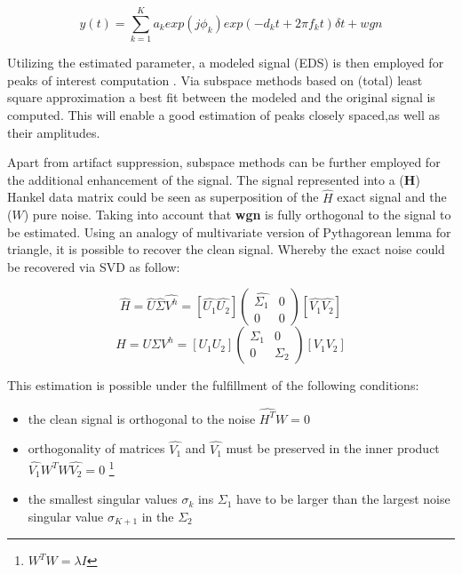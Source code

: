  
\begin{equation}\label{eq1}
y(t)=\sum_{k=1}^{K} a_{k}exp(j\phi_{k})exp(-d_{k}t+2\pi f_{k}t)\delta t+wgn
\end{equation}

Utilizing the estimated parameter, a modeled signal (EDS) is then employed for peaks of interest computation . Via subspace methods based on (total) least square approximation a best fit between the modeled and the original signal is computed. This will enable a good estimation of peaks closely spaced,as well as their amplitudes. 



Apart from artifact suppression, subspace methods can be further employed for the additional enhancement of the signal. The signal represented into a (\textbf{H}) Hankel data matrix could be seen as superposition of the $\hat{H}$ exact signal and the ($W$) pure noise. Taking into account that \textbf{wgn} is fully orthogonal to the signal to be estimated. Using an analogy of multivariate version of Pythagorean lemma for triangle, it is possible to recover the clean signal. Whereby the exact noise could be recovered via SVD as follow:


\begin{figure}[!htbp]
%
\centering
\begin{equation}
 \hat{H}=\hat{U}\hat{\Sigma}\hat{V^{h}}=[\hat{U_{1}} \hat{U_{2}}]
\begin{pmatrix}
 \hat{\Sigma_{1}}&0\\
 0&0
 \end{pmatrix}
 [\hat{V_{1}} \hat{V_{2}}]
 \end{equation}
\endminipage\hfill
{}%
\centering
 \begin{equation}\label{eq3}
 H=U \Sigma V^{h}=[U_{1} U_{2}]
\begin{pmatrix}
 \Sigma_{1}&0\\
 0&\Sigma_{2}
 \end{pmatrix}
 [V_{1} V_{2}] 
\end{equation}
\endminipage\hfill
\end{figure}

This estimation is possible under the fulfillment of the following conditions:
\begin{itemize}
    \item the clean signal is orthogonal to the noise $\hat{H^{T}}W=0$
    \item orthogonality of matrices $\hat{V_{1}}$ and $\hat{V_{1}}$ must be preserved in the inner product $\hat{V_{1}}W^{T}W\hat{V_{2}}=0$ \footnote{$W^{T}W=\lambda I$} 
    \item the smallest singular values $\sigma_{k}$ ins $\Sigma_{1}$ have to be larger than the largest noise singular value $\sigma_{K+1}$ in the $\Sigma_{2}$    
\end{itemize}

